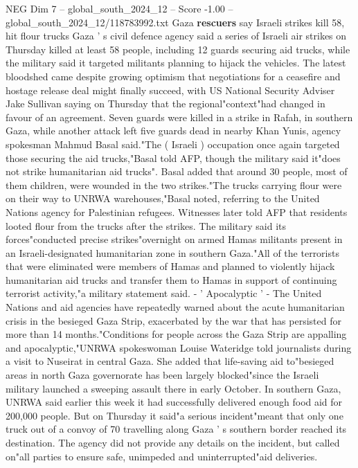 \begin{textsample}{NEG Dim 7 – global\_south\_2024\_12 – Score -1.00 – global\_south\_2024\_12/118783992.txt}  \label{ex:f7_neg_107}
Gaza \textbf{rescuers} say Israeli strikes kill 58, hit flour trucks Gaza ' s civil defence agency said a series of Israeli air strikes on Thursday killed at least 58 people, including 12 guards securing aid trucks, while the military said it targeted militants planning to hijack the vehicles.
The latest bloodshed came despite growing optimism that negotiations for a ceasefire and hostage release deal might finally succeed, with US National Security Adviser Jake Sullivan saying on Thursday that the regional"context"had changed in favour of an agreement.
Seven guards were killed in a strike in Rafah, in southern Gaza, while another attack left five guards dead in nearby Khan Yunis, agency spokesman Mahmud Basal said."The ( Israeli ) occupation once again targeted those securing the aid trucks,"Basal told AFP, though the military said it"does not strike humanitarian aid trucks".
Basal added that around 30 people, most of them children, were wounded in the two strikes."The trucks carrying flour were on their way to UNRWA warehouses,"Basal noted, referring to the United Nations agency for Palestinian refugees.
Witnesses later told AFP that residents looted flour from the trucks after the strikes.
The military said its forces"conducted precise strikes"overnight on armed Hamas militants present in an Israeli-designated humanitarian zone in southern Gaza."All of the terrorists that were eliminated were members of Hamas and planned to violently hijack humanitarian aid trucks and transfer them to Hamas in support of continuing terrorist activity,"a military statement said. - ' Apocalyptic ' - The United Nations and aid agencies have repeatedly warned about the acute humanitarian crisis in the besieged Gaza Strip, exacerbated by the war that has persisted for more than 14 months."Conditions for people across the Gaza Strip are appalling and apocalyptic,"UNRWA spokeswoman Louise Wateridge told journalists during a visit to Nuseirat in central Gaza.
She added that life-saving aid to"besieged areas in north Gaza governorate has been largely blocked"since the Israeli military launched a sweeping assault there in early October.
In southern Gaza, UNRWA said earlier this week it had successfully delivered enough food aid for 200,000 people.
But on Thursday it said"a serious incident"meant that only one truck out of a convoy of 70 travelling along Gaza ' s southern border reached its destination.
The agency did not provide any details on the incident, but called on"all parties to ensure safe, unimpeded and uninterrupted"aid deliveries.

\end{textsample}
